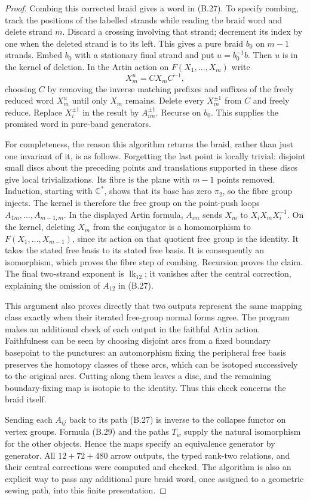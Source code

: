 \begin{proof}
Combing this corrected braid gives a word in (B.27).  To specify
combing, track the positions of the labelled strands while
reading the braid word and delete strand $m$.  Discard a crossing
involving that strand; decrement its index by one when the deleted
strand is to its left.  This gives a pure braid $b_0$ on $m-1$
strands.  Embed $b_0$ with a stationary final strand and put
$u=b_0^{-1}b$.  Then $u$ is in the kernel of deletion.  In the
Artin action on $F(X_1,\ldots,X_m)$ write
\[
 X_m^u=C X_m C^{-1},
\]
choosing $C$ by removing the inverse matching prefixes and
suffixes of the freely reduced word $X_m^u$ until only $X_m$
remains.  Delete every $X_m^{\pm1}$ from $C$ and freely reduce.
Replace $X_i^{\pm1}$ in the result by $A_{im}^{\pm1}$.  Recurse
on $b_0$.  This supplies the promised word in pure-band generators.

For completeness, the reason this algorithm returns the braid,
rather than just one invariant of it, is as follows.  Forgetting
the last point is locally trivial: disjoint small discs about
the preceding points and translations supported in these discs
give local trivializations.  Its fibre is the plane with $m-1$
points removed.  Induction, starting with $\mathbb C^*$, shows
that its base has zero $\pi_2$, so the fibre group injects.
The kernel is therefore the free group on the point-push loops
$A_{1m},\ldots,A_{m-1,m}$.  In the displayed Artin formula,
$A_{im}$ sends $X_m$ to $X_iX_mX_i^{-1}$.  On the kernel,
deleting $X_m$ from the conjugator is a homomorphism to
$F(X_1,\ldots,X_{m-1})$, since its action on that quotient free
group is the identity.  It takes the stated free basis to its
stated free basis.  It is consequently an isomorphism, which
proves the fibre step of combing.  Recursion proves the claim.
The final two-strand exponent is $\operatorname{lk}_{12}$;
it vanishes after the central correction, explaining the omission
of $A_{12}$ in (B.27).

This argument also proves directly that two outputs represent
the same mapping class exactly when their iterated free-group
normal forms agree.  The program makes an additional check of
each output in the faithful Artin action.  Faithfulness can be
seen by choosing disjoint arcs from a fixed boundary basepoint
to the punctures: an automorphism fixing the peripheral free
basis preserves the homotopy classes of these arcs, which can
be isotoped successively to the original arcs.  Cutting along
them leaves a disc, and the remaining boundary-fixing map is
isotopic to the identity.  Thus this check concerns the braid
itself.

Sending each $A_{ij}$ back to its path (B.27) is inverse to the
collapse functor on vertex groups.  Formula (B.29) and the paths
$T_w$ supply the natural isomorphism for the other objects.
Hence the maps specify an equivalence generator by generator.
All $12+72+480$ arrow outputs, the typed rank-two relations, and
their central corrections were computed and checked.  The
algorithm is also an explicit way to pass any additional pure
braid word, once assigned to a geometric sewing path, into this
finite presentation.
\end{proof}

